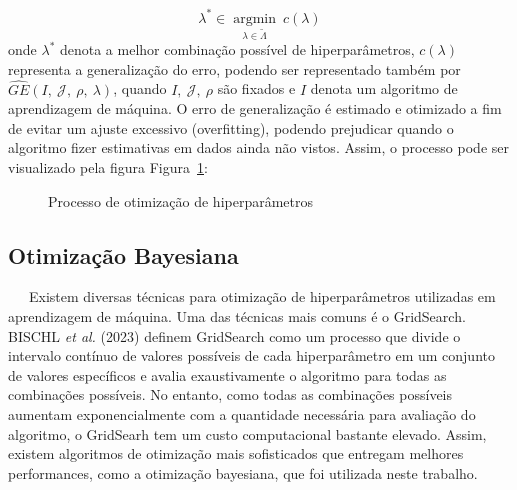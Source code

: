 \documentclass[
  12pt,
  letterpaper,
  DIV=11,
  numbers=noendperiod]{scrreprt}
\begin{document}
\[
\lambda^* \in \underset{\lambda \in \tilde \Lambda}{\operatorname{argmin}} \ c\left(\lambda \right)
\] onde \(\lambda^*\) denota a melhor combinação possível de
hiperparâmetros, \(c\left(\lambda \right)\) representa a generalização
do erro, podendo ser representado também por
\(\widehat{GE}\left(I, \ \mathcal J, \ \rho, \ \lambda\right)\), quando
\(I, \ \mathcal{J}, \ \rho\) são fixados e \(I\) denota um algoritmo de
aprendizagem de máquina. O erro de generalização é estimado e otimizado
a fim de evitar um ajuste excessivo (overfitting), podendo prejudicar
quando o algoritmo fizer estimativas em dados ainda não vistos. Assim, o
processo pode ser visualizado pela figura Figura~\ref{fig-hpo}:

\begin{figure}


\caption{\label{fig-hpo}Processo de otimização de hiperparâmetros}

\end{figure}%

\vspace{12pt}

\subsection{Otimização Bayesiana}\label{otimizauxe7uxe3o-bayesiana}

~~~Existem diversas técnicas para otimização de hiperparâmetros
utilizadas em aprendizagem de máquina. Uma das técnicas mais comuns é o
GridSearch. BISCHL \emph{et al.} (2023) definem GridSearch como um
processo que divide o intervalo contínuo de valores possíveis de cada
hiperparâmetro em um conjunto de valores específicos e avalia
exaustivamente o algoritmo para todas as combinações possíveis. No
entanto, como todas as combinações possíveis aumentam exponencialmente
com a quantidade necessária para avaliação do algoritmo, o GridSearh tem
um custo computacional bastante elevado. Assim, existem algoritmos de
otimização mais sofisticados que entregam melhores performances, como a
otimização bayesiana, que foi utilizada neste trabalho.
\end{document}
